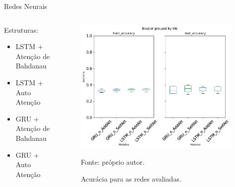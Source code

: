     \begin{frame}{Redes Neurais}


        \begin{columns}
            \begin{column}{0.5\textwidth}

                Estruturas: 
                \begin{itemize}
                    \item LSTM + Atenção de Bahdanau
                    \item LSTM + Auto Atenção
                    \item GRU + Atenção de Bahdanau
                    \item GRU + Auto Atenção
                \end{itemize}

            \end{column}

            \begin{column}{0.5\textwidth}


                \begin{figure}[htbp]
                    \centering
                    \caption{Acurácia para as redes avaliadas.}
                    \label{fig:accuracy}
                    \includegraphics[width=0.98\textwidth]{./images/boxplot_val_01.png}
                    \par \footnotesize Fonte: próprio autor.
                \end{figure}

            \end{column}
        \end{columns}



    \end{frame}





